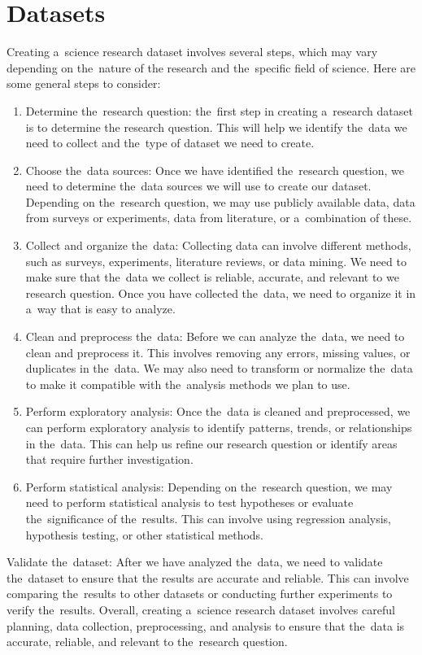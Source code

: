     \section{Datasets}\label{subsec:datasets}
        Creating a~science research dataset involves several steps, which may vary depending on the~nature of the
        research and the~specific field of science. Here are some general steps to consider:
        \begin{enumerate}
            \item Determine the~research question: the~first step in creating a~research dataset is to determine the
            research question. This will help we identify the~data we need to collect and the~type of dataset
            we need to create.
            \item Choose the~data sources: Once we have identified the~research question, we need to determine
            the~data sources we will use to create our dataset. Depending on the~research question, we may use
            publicly available data, data from surveys or experiments, data from literature, or a~combination of these.
            \item Collect and organize the~data: Collecting data can involve different methods, such as surveys,
            experiments, literature reviews, or data mining. We need to make sure that the~data we collect is reliable,
            accurate, and relevant to we research question. Once you have collected the~data, we need to organize
            it in a~way that is easy to analyze.
            \item Clean and preprocess the~data: Before we can analyze the~data, we need to clean and preprocess it.
            This involves removing any errors, missing values, or duplicates in the~data. We may also need to
            transform or normalize the~data to make it compatible with the~analysis methods we plan to use.
            \item Perform exploratory analysis: Once the~data is cleaned and preprocessed, we can perform exploratory
            analysis to identify patterns, trends, or relationships in the~data. This can help us refine our research
            question or identify areas that require further investigation.
            \item Perform statistical analysis: Depending on the~research question, we may need to perform statistical
            analysis to test hypotheses or evaluate the~significance of the~results. This can involve using regression
            analysis, hypothesis testing, or other statistical methods.
        \end{enumerate}
        Validate the~dataset: After we have analyzed the~data, we need to validate the~dataset to ensure that the
        results are accurate and reliable. This can involve comparing the~results to other datasets or conducting
        further experiments to verify the~results. Overall, creating a~science research dataset involves careful
        planning, data collection, preprocessing, and analysis to ensure that the~data is accurate, reliable, and
        relevant to the~research question.
